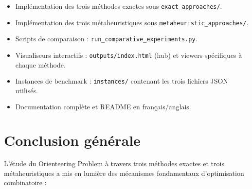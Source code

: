\documentclass[11pt,a4paper]{article}
\begin{document}
\begin{itemize}
    \item Implémentation des trois méthodes exactes sous \texttt{exact\_approaches/}.
    \item Implémentation des trois métaheuristiques sous \texttt{metaheuristic\_approaches/}.
    \item Scripts de comparaison : \texttt{run\_comparative\_experiments.py}.
    \item Visualiseurs interactifs : \texttt{outputs/index.html} (hub) et viewers spécifiques à chaque méthode.
    \item Instances de benchmark : \texttt{instances/} contenant les trois fichiers JSON utilisés.
    \item Documentation complète et README en français/anglais.
\end{itemize}

\section{Conclusion générale}

L'étude du Orienteering Problem à travers trois méthodes exactes et trois métaheuristiques a mis en lumière des mécanismes fondamentaux d'optimisation combinatoire :
\end{document}
